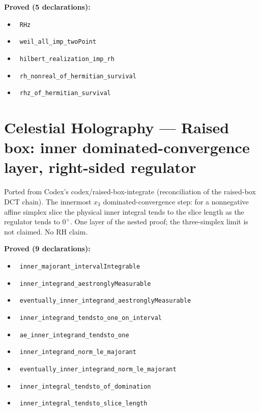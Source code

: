 \documentclass{report}
\theoremstyle{definition}
\begin{document}
\noindent\textbf{Proved (5 declarations):}
\begin{itemize}
  \item {}\leanok\ \texttt{RHz}
  \item {}\leanok\ \texttt{weil\_all\_imp\_twoPoint}
  \item {}\leanok\ \texttt{hilbert\_realization\_imp\_rh}
  \item {}\leanok\ \texttt{rh\_nonreal\_of\_hermitian\_survival}
  \item {}\leanok\ \texttt{rhz\_of\_hermitian\_survival}
\end{itemize}

\section{Celestial Holography --- Raised box: inner dominated-convergence layer, right-sided regulator}
Ported from Codex's codex/raised-box-integrate (reconciliation of the raised-box DCT chain). The innermost $x_3$ dominated-convergence step: for a nonnegative affine simplex slice the physical inner integral tends to the slice length as the regulator tends to $0^+$. One layer of the nested proof; the three-simplex limit is not claimed. No RH claim.

\noindent\textbf{Proved (9 declarations):}
\begin{itemize}
  \item {}\leanok\ \texttt{inner\_majorant\_intervalIntegrable}
  \item {}\leanok\ \texttt{inner\_integrand\_aestronglyMeasurable}
  \item {}\leanok\ \texttt{eventually\_inner\_integrand\_aestronglyMeasurable}
  \item {}\leanok\ \texttt{inner\_integrand\_tendsto\_one\_on\_interval}
  \item {}\leanok\ \texttt{ae\_inner\_integrand\_tendsto\_one}
  \item {}\leanok\ \texttt{inner\_integrand\_norm\_le\_majorant}
  \item {}\leanok\ \texttt{eventually\_inner\_integrand\_norm\_le\_majorant}
  \item {}\leanok\ \texttt{inner\_integral\_tendsto\_of\_domination}
  \item {}\leanok\ \texttt{inner\_integral\_tendsto\_slice\_length}
\end{itemize}
\end{document}
